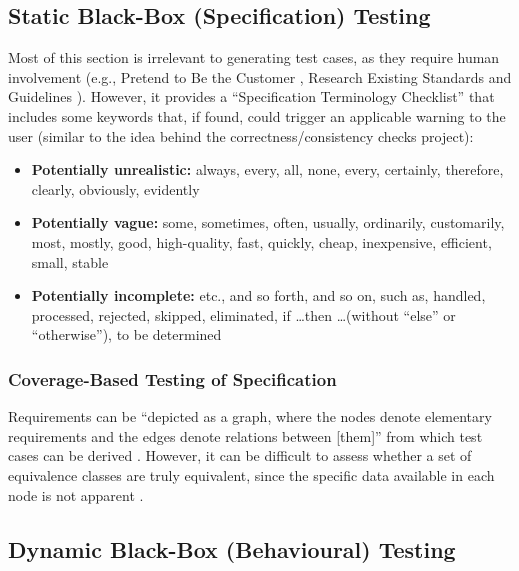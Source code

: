 \subsection{Static Black-Box (Specification) Testing
      \cite[p.~56-62]{patton_software_2006}}

Most of this section is irrelevant to generating test cases, as they require
human involvement  (e.g., Pretend to Be the Customer
\cite[p.~57-58]{patton_software_2006}, Research Existing Standards and
Guidelines \cite[p.~58-59]{patton_software_2006}). However, it provides a
``Specification Terminology Checklist'' \cite[p.~61]{patton_software_2006} that
includes some keywords that, if found, could trigger an applicable warning to
the user (similar to the idea behind the correctness/consistency checks
project):

\begin{itemize}
      \item \textbf{Potentially unrealistic:} always, every, all, none, every,
            certainly, therefore, clearly, obviously, evidently
      \item \textbf{Potentially vague:} some, sometimes, often, usually,
            ordinarily, customarily, most, mostly, good, high-quality, fast,
            quickly, cheap, inexpensive, efficient, small, stable
      \item \textbf{Potentially incomplete:} etc., and so forth, and so on,
            such as, handled, processed, rejected, skipped, eliminated,
            if \dots then \dots (without ``else'' or ``otherwise''),
            to be determined \cite[p.~408]{van_vliet_software_2000}
\end{itemize}

\subsubsection{Coverage-Based Testing of Specification
      \cite[pp.~425-426]{van_vliet_software_2000}}

Requirements can be ``depicted as a graph, where the nodes denote elementary
requirements and the edges denote relations between [them]'' from which test
cases can be derived \cite[p.~425]{van_vliet_software_2000}. However, it can
be difficult to assess whether a set of equivalence classes are truly
equivalent, since the specific data available in each node is not apparent
\cite[p.~426]{van_vliet_software_2000}.

\subsection{Dynamic Black-Box (Behavioural) Testing
      \cite[pp.~64-65]{patton_software_2006}}

